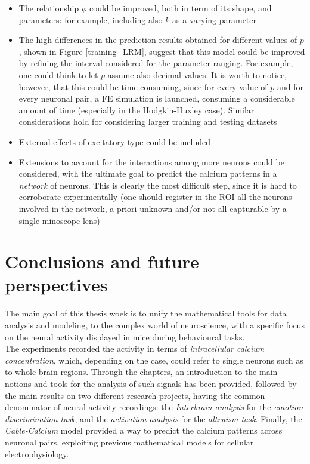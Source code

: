 \documentclass[12pt, a4paper]{report}
\begin{document}
\begin{itemize}
	\item The relationship $\phi$ could be improved, both in term of its shape, and  parameters: for example, including also $k$ as a varying parameter
	
	\item The high differences in the prediction results obtained for different values of $p$, shown in Figure \ref{training_LRM}, suggest that this model could be improved by refining the interval considered for the parameter ranging. For example, one could think to let $p$ assume also decimal values. It is worth to notice, however, that this could be time-consuming, since for every value of $p$ and for every neuronal pair, a FE simulation is launched, consuming a considerable amount of time (especially in the Hodgkin-Huxley case). Similar considerations hold for considering larger training and testing datasets
	
	\item External effects of excitatory type could be included
	
	\item Extensions to account for the interactions among more neurons could be considered, with the ultimate goal to predict the calcium patterns in a \textit{network} of neurons. This is clearly the most difficult step, since it is hard to corroborate experimentally (one should register in the ROI all the neurons involved in the network, a priori unknown and/or not all capturable by a single minoscope lens)
	
\end{itemize}  

\chapter{Conclusions and future perspectives}

The main goal of this thesis woek is to unify the mathematical tools for data analysis and modeling, to the complex world of neuroscience, with a specific focus on the neural activity displayed in mice during behavioural tasks.\\
The experiments recorded  the activity in terms of \textit{intracellular calcium concentration}, which, depending on the case, could refer to single neurons such as to whole brain regions. Through the chapters, an introduction to the main notions and tools for the analysis of such signals has been provided, followed by the main results on two different research projects, having the common denominator of neural activity recordings: the \textit{Interbrain analysis} for the \textit{emotion discrimination task}, and the \textit{activation analysis} for the \textit{altruism task}. Finally, the \textit{Cable-Calcium} model provided a way to predict the calcium patterns across neuronal pairs, exploiting previous mathematical models for cellular electrophysiology.\\
\end{document}
